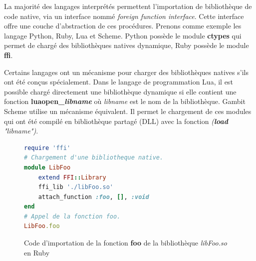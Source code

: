 La majorité des langages interprétés permettent l'importation de bibliothèque
de code native, via un interface nommé \textit{foreign function interface}.
Cette interface offre une couche d'abstraction de ces procédures.
Prenons comme exemple les langage Python, Ruby, Lua et Scheme. Python possède
le module \textbf{ctypes} qui permet de chargé des bibliothèques natives dynamique, Ruby
possède le module \textbf{ffi}.


Certains langages ont un mécanisme pour charger des bibliothèques natives s'ils
ont été conçus spécialement.  Dans le langage de programmation Lua, il est
possible chargé directement une bibliothèque dynamique si elle contient une
fonction \textbf{luaopen\_\textit{libname}} où \textit{libname} est le nom de
la bibliothèque.  Gambit Scheme utilise un mécanisme équivalent. Il permet le
chargement de ces modules qui ont été compilé en bibliothèque partagé (DLL)
avec la fonction \textit{(\textbf{load} "libname")}.


\begin{center}
\begin{figure}[ht]
\begin{lstlisting}[language=ruby,frame=single]
require 'ffi'
# Chargement d'une bibliotheque native.
module LibFoo
    extend FFI::Library
    ffi_lib './libFoo.so'
    attach_function :foo, [], :void
end
# Appel de la fonction foo.
LibFoo.foo
\end{lstlisting}
\caption{Code d'importation de la fonction \textbf{foo} de la bibliothèque \textit{libFoo.so} en Ruby}
\end{figure}
\end{center}

